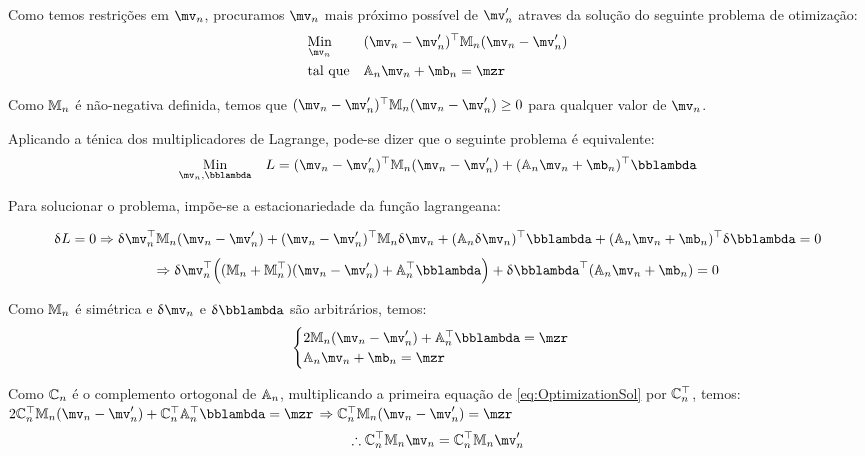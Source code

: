 Como temos restri\c{c}\~oes em $\mv_n$, procuramos $\mv_n$ mais pr\'oximo poss\'ivel de $\mv'_n$ atraves da solu\c{c}\~ao do seguinte problema de otimiza\c{c}\~ao:
\begin{equation} \label{eq:Optimization}
\begin{aligned}
& \underset{\mv_n}{\text{Min}}
& & (\mv_n - \mv'_n)^\top \mM_n (\mv_n - \mv'_n) \\
& \text{tal que}
& & \mA_n \mv_n + \mb_n = \mzr
\end{aligned}
\end{equation}

Como $\mathbb{M}_n$ \'e n\~ao-negativa definida, temos que $(\mv_n - \mv'_n)^\top \mM_n (\mv_n - \mv'_n) \geq 0 $ para qualquer valor de $\mv_n$.

Aplicando a t\'enica dos multiplicadores de Lagrange, pode-se dizer que o seguinte problema \'e equivalente:
\begin{equation}
\begin{aligned}
& \underset{\mv_n, \mlambda}{\text{Min}}
& & L = (\mv_n - \mv'_n)^\top \mM_n (\mv_n - \mv'_n) + (\mA_n \mv_n + \mb_n)^\top \mlambda \\
\end{aligned}
\end{equation}


Para solucionar o problema, imp\~oe-se a estacionariedade da fun\c{c}\~ao lagrangeana:

$$ \dl L = 0 \Rightarrow \dl \mv_n^\top \mM_n (\mv_n - \mv'_n) + (\mv_n - \mv'_n)^\top \mM_n \dl \mv_n + (\mA_n \dl \mv_n)^\top \mlambda + (\mA_n \mv_n + \mb_n)^\top \dl \mlambda = 0 $$
$$ \Rightarrow \dl \mv_n^\top \Big( (\mM_n + \mM_n^\top)(\mv_n - \mv'_n) + \mA_n^\top \mlambda \Big) + \dl \mlambda^\top (\mA_n \mv_n + \mb_n) = 0 $$

Como $\mathbb{M}_n$ \'e sim\'etrica e $\dl \mv_n$ e $\dl \mlambda$ s\~ao arbitr\'arios, temos:
\begin{equation} \label{eq:OptimizationSol}
\begin{cases}
2 \mM_n (\mv_n - \mv'_n) + \mA_n^\top \mlambda = \mzr \\
\mA_n \mv_n + \mb_n = \mzr
\end{cases}
\end{equation}

Como $\mathbb{C}_n$ \'e o complemento ortogonal de $\mathbb{A}_n$, multiplicando a primeira equa\c{c}\~ao de \eqref{eq:OptimizationSol} por $\mathbb{C}_n^\top$, temos: \\

$ 2 \mC_n^\top \mM_n (\mv_n - \mv'_n) + \mC_n^\top \mA_n^\top \mlambda = \mzr $
$ \Rightarrow  \mC_n^\top \mM_n (\mv_n - \mv'_n)  = \mzr $
\begin{equation} \label{eq:OptimizationSol2}
\therefore \mC_n^\top \mM_n \mv_n  = \mC_n^\top \mM_n  \mv'_n
\end{equation}

